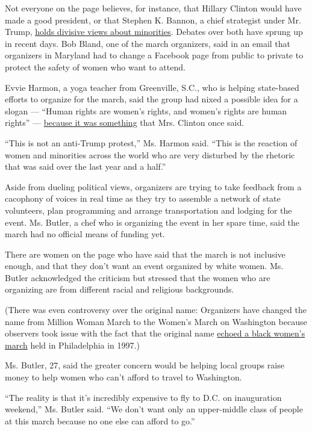 Not everyone on the page believes, for instance, that Hillary Clinton
would have made a good president, or that Stephen K. Bannon, a chief
strategist under Mr. Trump,
\href{http://www.nytimes.com/2016/11/15/us/politics/stephen-bannon-white-house-trump.html}{holds
divisive views about minorities}. Debates over both have sprung up in
recent days. Bob Bland, one of the march organizers, said in an email
that organizers in Maryland had to change a Facebook page from public to
private to protect the safety of women who want to attend.

Evvie Harmon, a yoga teacher from Greenville, S.C., who is helping
state-based efforts to organize for the march, said the group had nixed
a possible idea for a slogan --- ``Human rights are women's rights, and
women's rights are human rights'' ---
\href{http://www.nytimes.com/politics/first-draft/2015/09/05/20-years-later-hillary-clintons-beijing-speech-on-women-resonates/}{because
it was something} that Mrs. Clinton once said.

``This is not an anti-Trump protest,'' Ms. Harmon said. ``This is the
reaction of women and minorities across the world who are very disturbed
by the rhetoric that was said over the last year and a half.''

Aside from dueling political views, organizers are trying to take
feedback from a cacophony of voices in real time as they try to assemble
a network of state volunteers, plan programming and arrange
transportation and lodging for the event. Ms. Butler, a chef who is
organizing the event in her spare time, said the march had no official
means of funding yet.

There are women on the page who have said that the march is not
inclusive enough, and that they don't want an event organized by white
women. Ms. Butler acknowledged the criticism but stressed that the women
who are organizing are from different racial and religious backgrounds.

(There was even controversy over the original name: Organizers have
changed the name from Million Woman March to the Women's March on
Washington because observers took issue with the fact that the original
name \href{http://www.blackpast.org/aah/million-woman-march-1997}{echoed
a black women's march} held in Philadelphia in 1997.)

Ms. Butler, 27, said the greater concern would be helping local groups
raise money to help women who can't afford to travel to Washington.

``The reality is that it's incredibly expensive to fly to D.C. on
inauguration weekend,'' Ms. Butler said. ``We don't want only an
upper-middle class of people at this march because no one else can
afford to go.''

